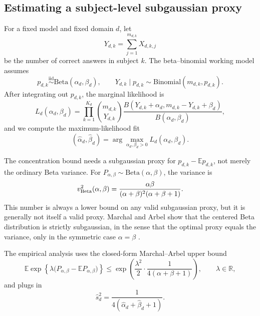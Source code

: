 \documentclass[11pt]{article}
\newcommand{\E}{\mathbb{E}}
\theoremstyle{definition}
\theoremstyle{remark}
\begin{document}
\subsection{Estimating a subject-level subgaussian proxy}

For a fixed model and fixed domain \(d\), let
\[
    Y_{d,k}=\sum_{j=1}^{m_{d,k}}X_{d,k,j}
\]
be the number of correct answers in subject \(k\).  The beta--binomial working model assumes
\[
    p_{d,k}\stackrel{\mathrm{iid}}{\sim}\mathrm{Beta}(\alpha_d,\beta_d),
    \qquad
    Y_{d,k}\mid p_{d,k}\sim\mathrm{Binomial}(m_{d,k},p_{d,k}).
\]
After integrating out \(p_{d,k}\), the marginal likelihood is
\[
    L_d(\alpha_d,\beta_d)
    =
    \prod_{k=1}^{K_d}
    {m_{d,k}\choose Y_{d,k}}
    \frac{B(Y_{d,k}+\alpha_d,m_{d,k}-Y_{d,k}+\beta_d)}{B(\alpha_d,\beta_d)},
\]
and we compute the maximum-likelihood fit
\[
    (\hat\alpha_d,\hat\beta_d)
    =
    \arg\max_{\alpha_d,\beta_d>0}L_d(\alpha_d,\beta_d).
\]

The concentration bound needs a subgaussian proxy for \(p_{d,k}-\E p_{d,k}\), not merely the ordinary Beta variance.  For \(P_{\alpha,\beta}\sim\mathrm{Beta}(\alpha,\beta)\), the variance is
\[
    v_{\rm Beta}^2(\alpha,\beta)
    =
    \frac{\alpha\beta}{(\alpha+\beta)^2(\alpha+\beta+1)}.
\]
This number is always a lower bound on any valid subgaussian proxy, but it is generally not itself a valid proxy.  Marchal and Arbel show that the centered Beta distribution is strictly subgaussian, in the sense that the optimal proxy equals the variance, only in the symmetric case \(\alpha=\beta\) \citep{marchal2017sub}.

The empirical analysis uses the closed-form Marchal--Arbel upper bound
\begin{equation}\label{eq:marchal-arbel-bound}
    \E\exp\!\left\{\lambda\bigl(P_{\alpha,\beta}-\E P_{\alpha,\beta}\bigr)\right\}
    \le
    \exp\!\left(
        \frac{\lambda^2}{2}\cdot
        \frac{1}{4(\alpha+\beta+1)}
    \right),
    \qquad \lambda\in\mathbb R,
\end{equation}
and plugs in
\begin{equation}
    \widehat s_d^2
    =
    \frac{1}{4(\hat\alpha_d+\hat\beta_d+1)}.
\end{equation}
\end{document}
